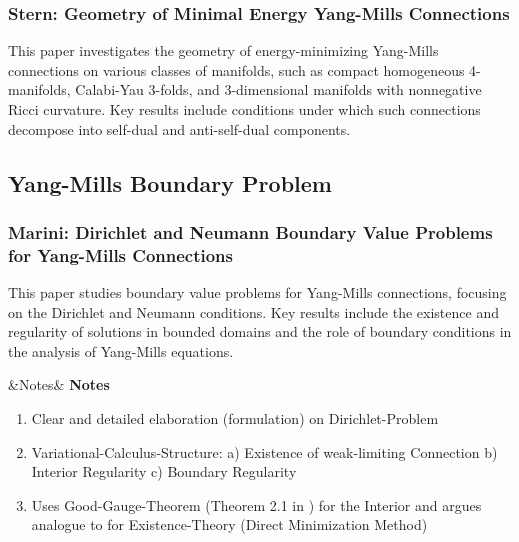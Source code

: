 \documentclass[10pt, letterpaper]{article}
\newenvironment{romanenum}[1][]
  {%
    \ifx&#1&%
    \else
      \textbf{#1}\quad %
    \fi
    \begin{enumerate}[label=\roman*)] %
  }
  {%
    \end{enumerate}%
  }
\theoremstyle{custom}
\theoremstyle{definition}
\begin{document}
\subsubsection{Stern: Geometry of Minimal Energy Yang-Mills Connections \cite{stern2010minimal}}
This paper investigates the geometry of energy-minimizing Yang-Mills connections on various classes of manifolds, such as compact homogeneous 4-manifolds, Calabi-Yau 3-folds, and 3-dimensional manifolds with nonnegative Ricci curvature. Key results include conditions under which such connections decompose into self-dual and anti-self-dual components.


\vspace{1cm}

\subsection{Yang-Mills Boundary Problem}


\subsubsection{Marini: Dirichlet and Neumann Boundary Value Problems for Yang-Mills Connections \cite{marini1992boundary}} 
This paper studies boundary value problems for Yang-Mills connections, focusing on the Dirichlet and Neumann conditions. Key results include the existence and regularity of solutions in bounded domains and the role of boundary conditions in the analysis of Yang-Mills equations.

\begin{romanenum}[Notes]
    \item Clear and detailed elaboration (formulation) on Dirichlet-Problem 
    \item Variational-Calculus-Structure: a) Existence of weak-limiting Connection b) Interior Regularity c) Boundary Regularity
    \item Uses Good-Gauge-Theorem (Theorem 2.1 in \cite{uhlenbeck1982connections}) for the Interior and argues analogue to \cite{sedlacek1982direct} for Existence-Theory (Direct Minimization Method)
\end{romanenum}
\end{document}
